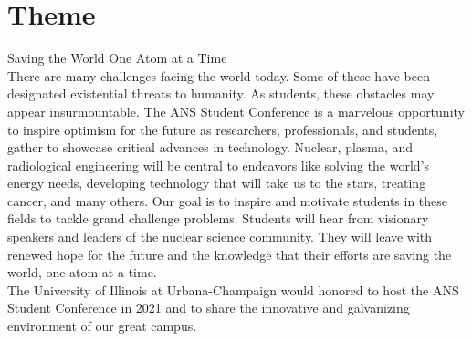 \section{Theme}

\Huge{Saving the World One Atom at a Time}\\

There are many challenges facing the world today. Some of these have been designated existential threats to humanity. As students, these obstacles may appear insurmountable. The ANS Student Conference is a marvelous opportunity to inspire optimism for the future as researchers, professionals, and students, gather to showcase critical advances in technology. Nuclear, plasma, and radiological engineering will be central to endeavors like solving the world's energy needs, developing technology that will take us to the stars, treating cancer, and many others.  Our goal is to inspire and motivate students in these fields to tackle grand challenge problems. Students will hear from visionary speakers and leaders of the nuclear science community. They will leave with renewed hope for the future and the knowledge that their efforts are saving the world, one atom at a time.\\
The University of Illinois at Urbana-Champaign would honored to host the ANS Student Conference in 2021 and to share the innovative and galvanizing environment of our great campus. 